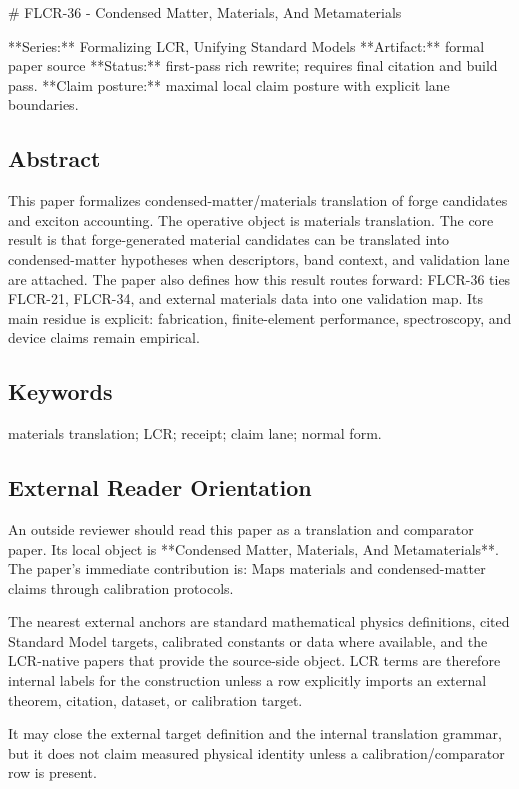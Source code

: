 \documentclass[11pt]{article}
\begin{document}
﻿\# FLCR-36 - Condensed Matter, Materials, And Metamaterials

**Series:** Formalizing LCR, Unifying Standard Models
**Artifact:** formal paper source
**Status:** first-pass rich rewrite; requires final citation and build pass.
**Claim posture:** maximal local claim posture with explicit lane boundaries.

\subsection*{Abstract}

This paper formalizes condensed-matter/materials translation of forge candidates and exciton accounting. The operative object is materials translation. The core result is that forge-generated material candidates can be translated into condensed-matter hypotheses when descriptors, band context, and validation lane are attached. The paper also defines how this result routes forward: FLCR-36 ties FLCR-21, FLCR-34, and external materials data into one validation map. Its main residue is explicit: fabrication, finite-element performance, spectroscopy, and device claims remain empirical.

\subsection*{Keywords}

materials translation; LCR; receipt; claim lane; normal form.

\subsection*{External Reader Orientation}

An outside reviewer should read this paper as a translation and comparator paper. Its local object is **Condensed Matter, Materials, And Metamaterials**. The paper's immediate contribution is: Maps materials and condensed-matter claims through calibration protocols.

The nearest external anchors are standard mathematical physics definitions, cited Standard Model targets, calibrated constants or data where available, and the LCR-native papers that provide the source-side object. LCR terms are therefore internal labels for the construction unless a row explicitly imports an external theorem, citation, dataset, or calibration target.

It may close the external target definition and the internal translation grammar, but it does not claim measured physical identity unless a calibration/comparator row is present.
\end{document}
